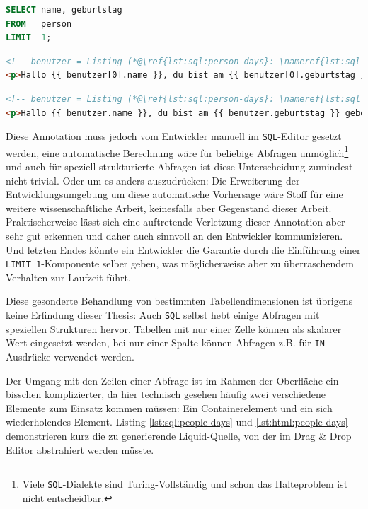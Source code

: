 \begin{lstlisting}[language=SQL, caption=Abfrage mit garantiert einer Ergebniszeile,label=lst:sql:person-days]
SELECT name, geburtstag
FROM   person
LIMIT  1;
\end{lstlisting}

\begin{lstlisting}[language=HTML, caption=String-Interpolation mit Indexzugriff, label=lst:html:person-days-index]
<!-- benutzer = Listing (*@\ref{lst:sql:person-days}: \nameref{lst:sql:person-days}@*) -->
<p>Hallo {{ benutzer[0].name }}, du bist am {{ benutzer[0].geburtstag }} geboren.</p>
\end{lstlisting}

\begin{lstlisting}[language=HTML, caption=String-Interpolation mit implizitem Index, label=lst:html:person-days]
<!-- benutzer = Listing (*@\ref{lst:sql:person-days}: \nameref{lst:sql:person-days}@*) -->
<p>Hallo {{ benutzer.name }}, du bist am {{ benutzer.geburtstag }} geboren.</p>
\end{lstlisting}

Diese Annotation muss jedoch vom Entwickler manuell im \texttt{SQL}-Editor gesetzt werden, eine automatische Berechnung wäre für beliebige Abfragen unmöglich\footnote{Viele \texttt{SQL}-Dialekte sind Turing-Vollständig und schon das Halteproblem ist nicht entscheidbar.} und auch für speziell strukturierte Abfragen ist diese Unterscheidung zumindest nicht trivial. Oder um es anders auszudrücken: Die Erweiterung der Entwicklungsumgebung um diese automatische Vorhersage wäre Stoff für eine weitere wissenschaftliche Arbeit, keinesfalls aber Gegenstand dieser Arbeit. Praktischerweise lässt sich eine auftretende Verletzung dieser Annotation aber sehr gut erkennen und daher auch sinnvoll an den Entwickler kommunizieren. Und letzten Endes könnte ein Entwickler die Garantie durch die Einführung einer \texttt{LIMIT 1}-Komponente selber geben, was möglicherweise aber zu überraschendem Verhalten zur Laufzeit führt.

Diese gesonderte Behandlung von bestimmten Tabellendimensionen ist übrigens keine Erfindung dieser Thesis: Auch \texttt{SQL} selbst hebt einige Abfragen mit speziellen Strukturen hervor. Tabellen mit nur einer Zelle können als skalarer Wert eingesetzt werden, bei nur einer Spalte können Abfragen z.B. für \texttt{IN}-Ausdrücke verwendet werden.

Der Umgang mit den Zeilen einer Abfrage ist im Rahmen der Oberfläche ein bisschen komplizierter, da hier technisch gesehen häufig zwei verschiedene Elemente zum Einsatz kommen müssen: Ein Containerelement und ein sich wiederholendes Element. Listing \ref{lst:sql:people-days} und \ref{lst:html:people-days} demonstrieren kurz die zu generierende Liquid-Quelle, von der im Drag \& Drop Editor abstrahiert werden müsste.

